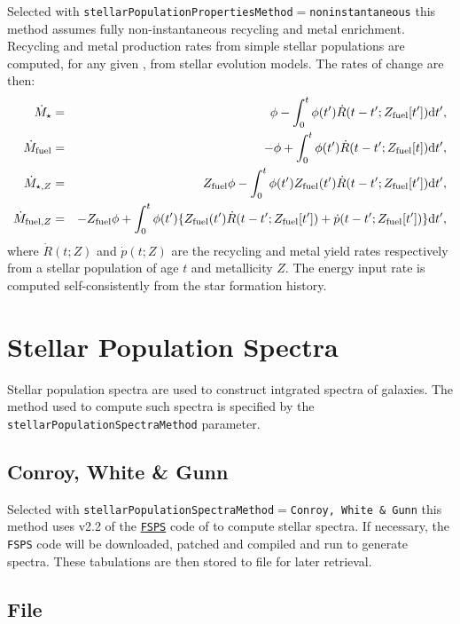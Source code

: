 Selected with {\tt stellarPopulationPropertiesMethod}$=${\tt noninstantaneous} this method assumes fully non-instantaneous recycling and metal enrichment. Recycling and metal production rates from simple stellar populations are computed, for any given \IMF, from stellar evolution models. The rates of change are then:
\begin{eqnarray}
 \dot{M}_\star &=& \phi - \int_0^t \phi(t^\prime) \dot{R}(t-t^\prime;Z_{\rm fuel}[t^\prime]) \d t^\prime, \\
 \dot{M}_{\rm fuel} &=& -\phi + \int_0^t \phi(t^\prime) \dot{R}(t-t^\prime;Z_{\rm fuel}[t]) \d t^\prime, \\
 \dot{M}_{\star,Z} &=& Z_{\rm fuel} \phi - \int_0^t \phi(t^\prime) Z_{\rm fuel}(t^\prime)  \dot{R}(t-t^\prime;Z_{\rm fuel}[t^\prime]) \d t^\prime, \\
 \dot{M}_{{\rm fuel},Z} &=& -Z_{\rm fuel} \phi + \int_0^t  \phi(t^\prime) \{ Z_{\rm fuel}(t^\prime) \dot{R}(t-t^\prime;Z_{\rm fuel}[t^\prime]) + \dot{p}(t-t^\prime;Z_{\rm fuel}[t^\prime]) \} \d t^\prime, \\
\end{eqnarray}
where $\dot{R}(t;Z)$ and $\dot{p}(t;Z)$ are the recycling and metal yield rates respectively from a stellar population of age $t$ and metallicity $Z$. The energy input rate is computed self-consistently from the star formation history.

\section{Stellar Population Spectra}

Stellar population spectra are used to construct intgrated spectra of galaxies. The method used to compute such spectra is specified by the {\tt stellarPopulationSpectraMethod} parameter.

\subsection{Conroy, White \& Gunn}

Selected with {\tt stellarPopulationSpectraMethod}$=${\tt Conroy, White \& Gunn} this method uses v2.2 of the \href{http://www.cfa.harvard.edu/~cconroy/FSPS.html}{{\tt FSPS}} code of \cite{conroy_propagation_2009} to compute stellar spectra. If necessary, the {\tt FSPS} code will be downloaded, patched and compiled and run to generate spectra. These tabulations are then stored to file for later retrieval.

\subsection{File}

